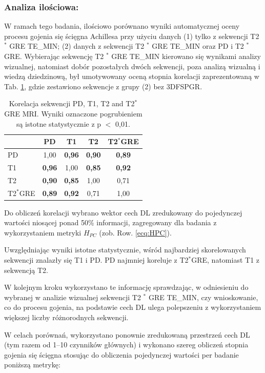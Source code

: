 \subsubsection{Analiza ilościowa:} W ramach tego badania, ilościowo porównano wyniki automatycznej oceny procesu gojenia się ścięgna Achillesa przy użyciu danych (1) tylko z sekwencji T2 $^\ast$ GRE TE\_MIN; (2) danych z sekwencji T2 $^\ast$ GRE TE\_MIN oraz PD i T2 $^\ast$ GRE. Wybierając sekwencję T2 $^\ast$ GRE TE\_MIN kierowano się wynikami analizy wizualnej, natomiast dobór pozostałych dwóch sekwencji, poza analizą wizualną i wiedzą dziedzinową, był umotywowany oceną stopnia korelacji zaprezentowaną w Tab. \ref{tab:inter-protocol-corr}, gdzie zestawiono sekwencje z grupy (2) bez 3DFSPGR.
\renewcommand{\arraystretch}{1.2}
\begin{table}[h]
	\centering
	\setlength{\tabcolsep}{12pt}
	\caption{Korelacja sekwencji PD, T1, T2 and T2$^\ast$ GRE MRI. Wyniki oznaczone pogrubieniem są istotne statystycznie z p $<$ 0,01.}
	\label{tab:inter-protocol-corr}
	\begin{tabular}{l||c|c|c|c}
		& PD & T1 & T2 & T2$^\ast$GRE \\ \hline \hline
		PD & 1,00 & \textbf{0,96} & \textbf{0,90} & \textbf{0,89} \\ \hline
		T1 & \textbf{0,96} & 1,00 & \textbf{0,85} & \textbf{0,92} \\ \hline
		T2 & \textbf{0,90} & \textbf{0,85} & 1,00 & 0,71 \\ \hline
		T2$^\ast$GRE & \textbf{0,89} & \textbf{0,92} & 0,71 & 1,00  %
	\end{tabular}
\end{table} 
\renewcommand{\arraystretch}{1}
Do obliczeń korelacji wybrano wektor cech DL zredukowany do pojedynczej wartości niosącej ponad 50\% informacji, zagregowany dla badania z wykorzystaniem metryki $H_{PC}$ (zob. Row. \ref{ecq:HPC}). 

Uwzględniając wyniki istotne statystycznie, wśród najbardziej skorelowanych sekwencji znalazły się T1 i PD. PD najmniej koreluje z T2$^\ast$GRE, natomiast T1 z sekwencją T2. 

W kolejnym kroku wykorzystano te informację sprawdzając, w odniesieniu do wybranej w analizie wizualnej sekwencji T2 $^\ast$ GRE TE\_MIN, czy wnioskowanie, co do procesu gojenia, na podstawie cech DL ulega polepszeniu z wykorzystaniem większej liczby różnorodnych sekwencji. 

W celach porównań, wykorzystano ponownie zredukowaną przestrzeń cech DL (tym razem od 1--10 czynników głównych) i wykonano szereg obliczeń stopnia gojenia się ścięgna stosując do obliczenia pojedynczej wartości per badanie poniższą metrykę: 

